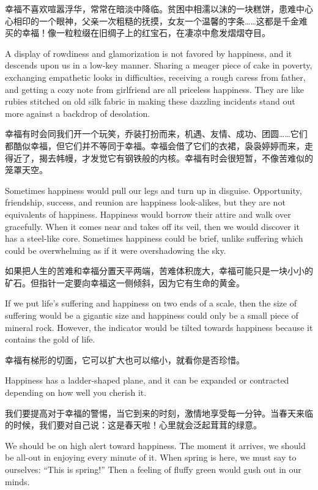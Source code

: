 {幸福不喜欢喧嚣浮华，常常在暗淡中降临。贫困中相濡以沫的一块糕饼，患难中心心相印的一个眼神，父亲一次粗糙的抚摸，女友一个温馨的字条……这都是千金难买的幸福！像一粒粒缀在旧绸子上的红宝石，在凄凉中愈发熠熠夺目。

A display of rowdiness and glamorization is not favored by happiness, and it descends upon us in a low-key manner. Sharing a meager piece of cake in poverty, exchanging empathetic looks in difficulties, receiving a rough caress from father, and getting a cozy note from girlfriend are all priceless happiness. They are like rubies stitched on old silk fabric in making these dazzling incidents stand out more against a backdrop of desolation.

幸福有时会同我们开一个玩笑，乔装打扮而来，机遇、友情、成功、团圆……它们都酷似幸福，但它们并不等同于幸福。幸福会借了它们的衣裙，袅袅婷婷而来，走得近了，揭去帏幔，才发觉它有钢铁般的内核。幸福有时会很短暂，不像苦难似的笼罩天空。

Sometimes happiness would pull our legs and turn up in disguise. Opportunity, friendship, success, and reunion are happiness look-alikes, but they are not equivalents of happiness. Happiness would borrow their attire and walk over gracefully. When it comes near and takes off its veil, then we would discover it has a steel-like core. Sometimes happiness could be brief, unlike suffering which could be overwhelming as if it were overshadowing the sky.

如果把人生的苦难和幸福分置天平两端，苦难体积庞大，幸福可能只是一块小小的矿石。但指针一定要向幸福这一侧倾斜，因为它有生命的黄金。

If we put life's suffering and happiness on two ends of a scale, then the size of suffering would be a gigantic size and happiness could only be a small piece of mineral rock. However, the indicator would be tilted towards happiness because it contains the gold of life.

幸福有梯形的切面，它可以扩大也可以缩小，就看你是否珍惜。

Happiness has a ladder-shaped plane, and it can be expanded or contracted depending on how well you cherish it.

我们要提高对于幸福的警惕，当它到来的时刻，激情地享受每一分钟。当春天来临的时候，我们要对自己说：这是春天啦！心里就会泛起茸茸的绿意。

We should be on high alert toward happiness. The moment it arrives, we should be all-out in enjoying every minute of it. When spring is here, we must say to ourselves: “This is spring!” Then a feeling of fluffy green would gush out in our minds.

}
